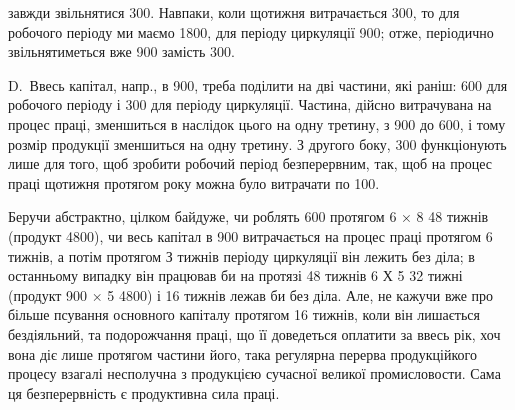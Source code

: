 \parcont{}  %
завжди звільнятися 300. Навпаки, коли щотижня витрачається
300, то для робочого періоду ми маємо 1800, для періоду
циркуляції 900; отже, періодично звільнятиметься вже 900
замість 300.

D.~Ввесь капітал, напр., в 900, треба поділити на дві частини,
які раніш: 600 для робочого періоду і 300 для періоду
циркуляції. Частина, дійсно витрачувана на процес праці, зменшиться в
наслідок цього на одну третину, з 900 до 600, і тому розмір продукції
зменшиться на одну третину. З другого боку, 300
функціонують лише для того, щоб зробити робочий період безперервним,
так, щоб на процес праці щотижня протягом року можна було витрачати
по 100.

Беручи абстрактно, цілком байдуже, чи роблять 600 протягом
6 × 8 \deq{} 48 тижнів (продукт \deq{} 4800), чи весь капітал в 900
витрачається на процес праці протягом 6 тижнів, а потім протягом
З тижнів періоду циркуляції він лежить без діла; в останньому випадку
він працював би на протязі 48 тижнів 6 Х 5  \deq{} 32 тижні (продукт \deq{}
900 × 5 \deq{} 4800) і 16 тижнів лежав би без діла. Але, не кажучи
вже про більше псування основного капіталу протягом 16 тижнів, коли
він лишається бездіяльний, та подорожчання праці, що її доведеться оплатити
за ввесь рік, хоч вона діє лише протягом частини його, така регулярна
перерва продукційкого процесу взагалі несполучна з продукцією
сучасної великої промисловости. Сама ця безперервність є продуктивна
сила праці.

